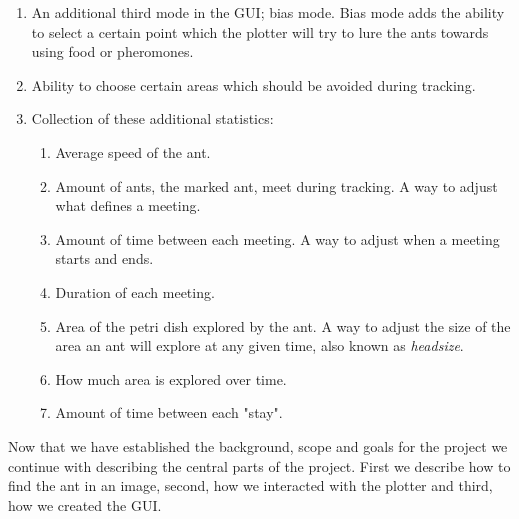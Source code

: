 \begin{enumerate}
	\item An additional third mode in the GUI; bias mode. Bias mode adds the ability to select a certain point which the plotter will try to lure the ants towards using food or pheromones.
    \item Ability to choose certain areas which should be avoided during tracking.
    \item Collection of these additional statistics:
    \begin{enumerate}
        \item Average speed of the ant.
        \item Amount of ants, the marked ant, meet during tracking. A way to adjust what defines a meeting.
        \item Amount of time between each meeting. A way to adjust when a meeting starts and ends.
        \item Duration of each meeting.
        \item Area of the petri dish explored by the ant. A way to adjust the size of the area an ant will explore at any given time, also known as \emph{headsize}.
        \item How much area is explored over time.
        \item Amount of time between each "stay".
    \end{enumerate}
\end{enumerate}

Now that we have established the background, scope and goals for the project we continue with describing the central parts of the project. First we describe how to find the ant in an image, second, how we interacted with the plotter and third, how we created the GUI.

